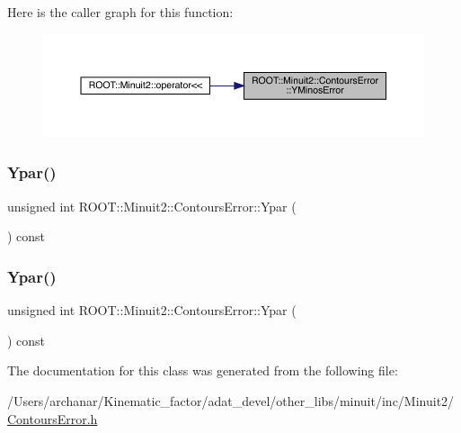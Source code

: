 Here is the caller graph for this function\+:\nopagebreak
\begin{figure}[H]
\begin{center}
\leavevmode
\includegraphics[width=350pt]{d3/de9/classROOT_1_1Minuit2_1_1ContoursError_a7ca7b0f224597473592c8da5a5825d61_icgraph}
\end{center}
\end{figure}
\mbox{\label{classROOT_1_1Minuit2_1_1ContoursError_a3d118d7b9c49e6835130e0ce50b94b18}} 
\subsubsection{\texorpdfstring{Ypar()}{Ypar()}\hspace{0.1cm}{\footnotesize\ttfamily [1/2]}}
{\footnotesize\ttfamily unsigned int R\+O\+O\+T\+::\+Minuit2\+::\+Contours\+Error\+::\+Ypar (\begin{DoxyParamCaption}{ }\end{DoxyParamCaption}) const\hspace{0.3cm}{\ttfamily [inline]}}

\mbox{\label{classROOT_1_1Minuit2_1_1ContoursError_a3d118d7b9c49e6835130e0ce50b94b18}} 
\subsubsection{\texorpdfstring{Ypar()}{Ypar()}\hspace{0.1cm}{\footnotesize\ttfamily [2/2]}}
{\footnotesize\ttfamily unsigned int R\+O\+O\+T\+::\+Minuit2\+::\+Contours\+Error\+::\+Ypar (\begin{DoxyParamCaption}{ }\end{DoxyParamCaption}) const\hspace{0.3cm}{\ttfamily [inline]}}



The documentation for this class was generated from the following file\+:\begin{DoxyCompactItemize}
\item 
/\+Users/archanar/\+Kinematic\+\_\+factor/adat\+\_\+devel/other\+\_\+libs/minuit/inc/\+Minuit2/\mbox{\hyperlink{other__libs_2minuit_2inc_2Minuit2_2ContoursError_8h}{Contours\+Error.\+h}}\end{DoxyCompactItemize}
